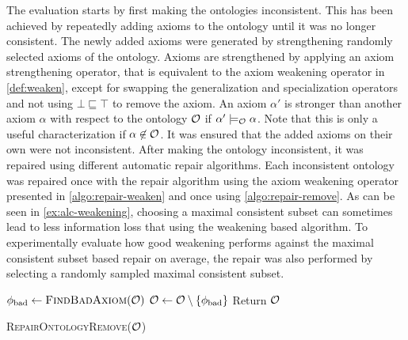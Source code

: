 The evaluation starts by first making the ontologies inconsistent. This has been achieved by repeatedly adding axioms to the ontology until it was no longer consistent. The newly added axioms were generated by strengthening randomly selected axioms of the ontology. Axioms are strengthened by applying an axiom strengthening operator, that is equivalent to the axiom weakening operator in \cref{def:weaken}, except for swapping the generalization and specialization operators and not using $\bot \sqsubseteq \top$ to remove the axiom. An axiom $\alpha'$ is stronger than another axiom $\alpha$ with respect to the ontology $\mathcal{O}$ if $\alpha' \models_\mathcal{O} \alpha$. Note that this is only a useful characterization if $\alpha \not\in \mathcal{O}$. It was ensured that the added axioms on their own were not inconsistent. After making the ontology inconsistent, it was repaired using different automatic repair algorithms. Each inconsistent ontology was repaired once with the repair algorithm using the axiom weakening operator presented in \cref{algo:repair-weaken} and once using \cref{algo:repair-remove}. As can be seen in \cref{ex:alc-weakening}, choosing a maximal consistent subset can sometimes lead to less information loss that using the weakening based algorithm. To experimentally evaluate how good weakening performs against the maximal consistent subset based repair on average, the repair was also performed by selecting a randomly sampled maximal consistent subset.

\begin{algorithm}[ht]
  \begin{algorithmic}
      \State $\phi_\textnormal{bad} \gets \textsc{FindBadAxiom}(\mathcal{O})$
      \State $\mathcal{O} \gets \mathcal{O} \setminus \{\phi_\textnormal{bad}\}$
    \EndWhile
    \State Return $\mathcal{O}$
  \end{algorithmic}
  \caption{\textsc{RepairOntologyRemove}($\mathcal{O}$)}
  \label{algo:repair-remove}
\end{algorithm}

